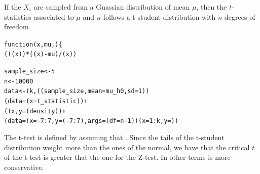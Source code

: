       If the $X_i$ are sampled from a Guassian distribution of mean $\mu$, then the $t$-statistics associated to $\mu$ and $n$ follows a t-student distribution with $n$ degrees of freedom 
\begin{knitrout}
\color{fgcolor}\begin{kframe}
\begin{alltt}
	function (x, mu, ) \{
    	   ( ((x))*( (x ) - mu)/(x))

sample_size <- 5
n <- 10000
data <- (k, ((sample_size, mean = mu_h0, sd = 1))
(data = ( x= t_statistic))  + 
      ( (x , y = (density)) + 
      	       (data = (x = -7:7, y = (-7:7), args = (df = n-1))(x = 1:k , y = ))
\end{alltt}


{\ttfamily\noindent\bfseries{}}\end{kframe}
\end{knitrout}
The t-test is defined by assuming that . Since the tails of the t-student distribution weight more than the ones of the normal, we have that the critical $t$ of the t-test is greater that the one for the Z-test. In other terms is more conservative. 
\begin{knitrout}
\color{fgcolor}\begin{kframe}
\begin{alltt}
 \hlkwb{=} 
 \hlkwb{=} 
\hldef{(}  \hlopt{-} \hldef{)}
\end{alltt}


{\ttfamily\noindent\bfseries{}}\begin{alltt}
\hldef{()}
\end{alltt}


{\ttfamily\noindent\bfseries{}}\end{kframe}
\end{knitrout}
